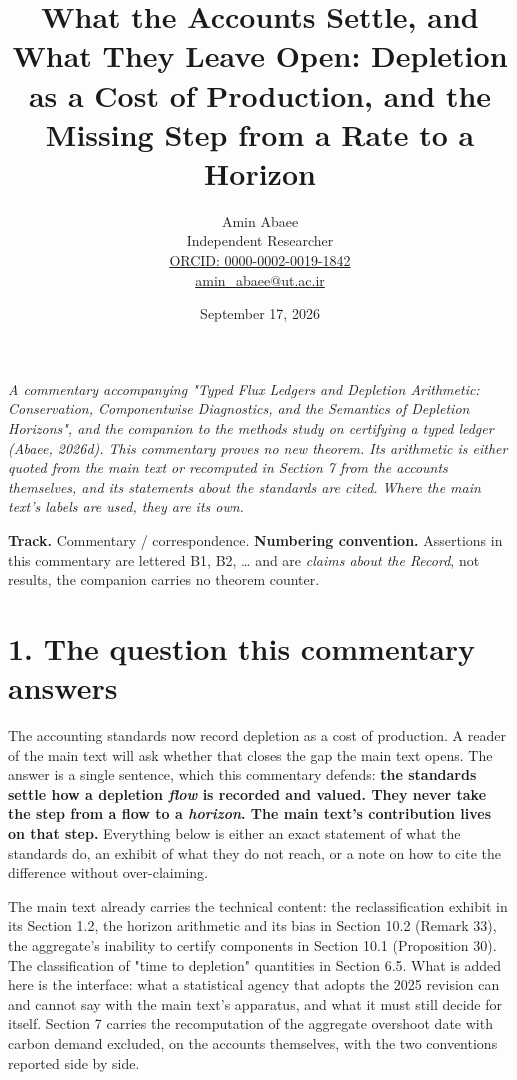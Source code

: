 \documentclass[11pt]{article}
\begin{document}
\title{What the Accounts Settle, and What They Leave Open: Depletion as a Cost of Production, and the Missing Step from a Rate to a Horizon}
\author{Amin Abaee\\[0.35em]
{\small Independent Researcher}\\[0.55em]
{\small\href{https://orcid.org/\allowbreak{}0000-0002-0019-1842}{ORCID: 0000-0002-0019-1842}}\\[0.3em]
{\small\href{mailto:amin\_abaee@ut.ac.ir}{amin\_abaee@ut.ac.ir}}}
\date{September 17, 2026}
\maketitle

\emph{A commentary accompanying "Typed Flux Ledgers and Depletion Arithmetic: Conservation, Componentwise Diagnostics, and the Semantics of Depletion Horizons", and the companion to the methods study on certifying a typed ledger (Abaee, 2026d). This commentary proves no new theorem. Its arithmetic is either quoted from the main text or recomputed in Section 7 from the accounts themselves, and its statements about the standards are cited. Where the main text's labels are used, they are its own.}

\textbf{Track.} Commentary / correspondence. \textbf{Numbering convention.} Assertions in this commentary are lettered B1, B2, \ldots{} and are \emph{claims about the Record}, not results, the companion carries no theorem counter.

\vspace{0.8em}

\section*{1. The question this commentary answers}\label{1-the-question-this-commentary-answers}

The accounting standards now record depletion as a cost of production. A reader of the main text will ask whether that closes the gap the main text opens. The answer is a single sentence, which this commentary defends: \textbf{the standards settle how a depletion \emph{flow} is recorded and valued. They never take the step from a flow to a \emph{horizon}. The main text's contribution lives on that step.} Everything below is either an exact statement of what the standards do, an exhibit of what they do not reach, or a note on how to cite the difference without over-claiming.

The main text already carries the technical content: the reclassification exhibit in its Section 1.2, the horizon arithmetic and its bias in Section 10.2 (Remark 33), the aggregate's inability to certify components in Section 10.1 (Proposition 30). The classification of "time to depletion" quantities in Section 6.5. What is added here is the interface: what a statistical agency that adopts the 2025 revision can and cannot say with the main text's apparatus, and what it must still decide for itself. Section 7 carries the recomputation of the aggregate overshoot date with carbon demand excluded, on the accounts themselves, with the two conventions reported side by side.
\end{document}
